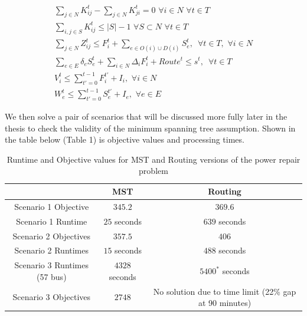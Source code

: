\documentclass{article}
\begin{document}
\begin{eqnarray}
	\sum_{j \in N} K_{ij}^t - \sum_{j \in N} K_{ji}^t = 0 \hspace{4pt} \forall i \in N \hspace{4pt} \forall t \in T\\
	\sum_{i,j \in S} K_{ij}^t \leq |S|-1 \hspace{4pt} \forall S \subset N \hspace{4pt} \forall t \in T\\
	\sum_{j \in N} Z_{ij}^t \leq F_i^t + \sum_{e \in O(i) \cup D(i)} S_{e}^t, \hspace{6pt} \forall t \in T, \hspace{4pt} \forall i \in N \\
	\sum_{e \in E} \delta_{e}S_e^t + \sum_{i \in N}\Delta_{i}F_i^t + Route^t \le s^t, \hspace{6pt} \forall t \in T\\
	V_i^t \leq \sum_{t'=0}^{t-1} F_i^{t'}+I_i, \hspace{4pt} \forall i \in N\\
	W_{e}^t \leq \sum_{t'=0}^{t-1} S_{e}^{t'}+I_e, \hspace{4pt} \forall e \in E
	\end{eqnarray}
	
	We then solve a pair of scenarios that will be discussed more fully later in the thesis to check the validity of the minimum spanning tree assumption. Shown in the table below (Table 1) is objective values and processing times. 
 \begin{table}[htbp]
	\centering
	\begin{tabular}{|c|c|c|}
		\cline{2-3}
		\multicolumn{1}{c|}{} & MST  & Routing \\
		\hline
		Scenario 1 Objective                & $345.2$   & $369.6$   \\
		\hline
		Scenario 1 Runtime                & $25$ seconds   & $639$ seconds \\
		\hline
		Scenario 2 Objectives               & $357.5$   & $406$  \\
		\hline
		Scenario 2 Runtimes              & $15$ seconds   & $488$ seconds \\
		\hline
		Scenario 3 Runtimes (57 bus) & $4328$ seconds & $5400^*$ seconds\\
		\hline
		Scenario 3 Objectives	& $2748$ & No solution due to time limit (22\% gap at 90 minutes)\\
		\hline
	\end{tabular}
	\caption{Runtime and Objective values for MST and Routing versions of the power repair problem}
	\label{time}
\end{table}
\end{document}
